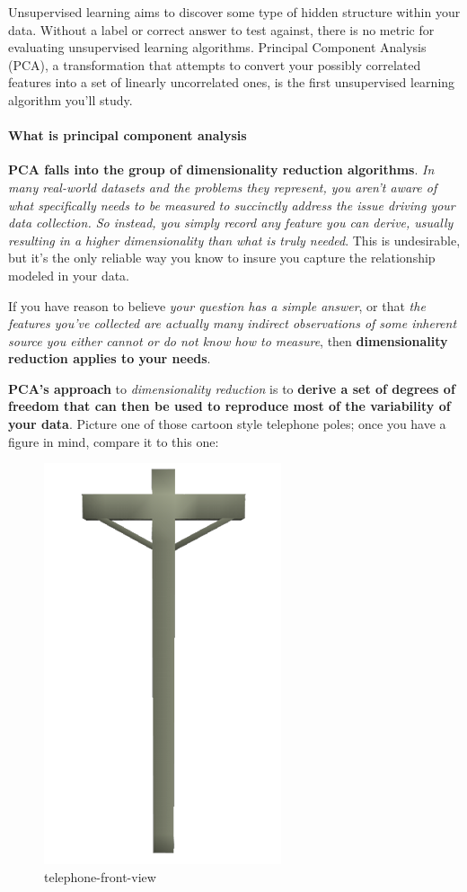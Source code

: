 \documentclass[11pt]{article}
\makeatletter
\def\maxwidth{\ifdim\Gin@nat@width>\linewidth\linewidth
    \else\Gin@nat@width\fi}
\let\Oldincludegraphics\includegraphics
\renewcommand{\includegraphics}[1]{\Oldincludegraphics[width=.8\maxwidth]{#1}}
\makeatother
\begin{document}
Unsupervised learning aims to discover some type of hidden structure
within your data. Without a label or correct answer to test against,
there is no metric for evaluating unsupervised learning algorithms.
Principal Component Analysis (PCA), a transformation that attempts to
convert your possibly correlated features into a set of linearly
uncorrelated ones, is the first unsupervised learning algorithm you'll
study.

\hypertarget{what-is-principal-component-analysis}{%
\paragraph{What is principal component
analysis}\label{what-is-principal-component-analysis}}

\textbf{PCA falls into the group of dimensionality reduction
algorithms}. \emph{In many real-world datasets and the problems they
represent, you aren't aware of what specifically needs to be measured to
succinctly address the issue driving your data collection. So instead,
you simply record any feature you can derive, usually resulting in a
higher dimensionality than what is truly needed}. This is undesirable,
but it's the only reliable way you know to insure you capture the
relationship modeled in your data.

If you have reason to believe \emph{your question has a simple answer},
or that \emph{the features you've collected are actually many indirect
observations of some inherent source you either cannot or do not know
how to measure}, then \textbf{dimensionality reduction applies to your
needs}.

\textbf{PCA's approach} to \emph{dimensionality reduction} is to
\textbf{derive a set of degrees of freedom that can then be used to
reproduce most of the variability of your data}. Picture one of those
cartoon style telephone poles; once you have a figure in mind, compare
it to this one:

\begin{figure}
\centering
\includegraphics{pic/telephone.png}
\caption{telephone-front-view}
\end{figure}
\end{document}
